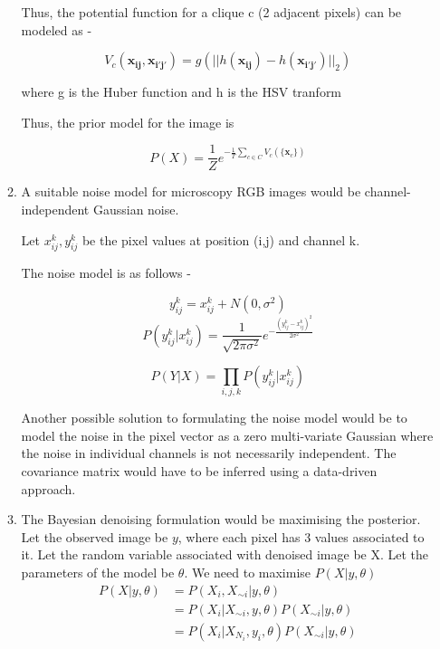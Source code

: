 \documentclass[11pt]{article}
\begin{document}
\begin{enumerate}
\begin{enumerate}
        Thus, the potential function for a clique c (2 adjacent pixels) can be modeled as - 
        
        $$
        V_c(\boldsymbol{x_{ij}},\boldsymbol{x_{i'j'}}) = g(||h(\boldsymbol{x_{ij}}) - h(\boldsymbol{x_{i'j'}})||_2)
        $$
        
        where g is the Huber function and h is the HSV tranform
        
        Thus, the prior model for the image is 
        
        $$
        P(X) = \frac{1}{Z}e^{-\frac{1}{T}\sum_{c \in C} V_c(\{\boldsymbol{x}_c\})}
        $$
        
        \item A suitable noise model for microscopy RGB images would be channel-independent Gaussian noise.
        
        Let $x_{ij}^k,y_{ij}^k$ be the pixel values at position (i,j) and channel k.
        
        The noise model is as follows - 
        
        $$
        y_{ij}^k = x_{ij}^k + N(0,\sigma^2)
        $$
        $$
        P(y_{ij}^k | x_{ij}^k) = \frac{1}{\sqrt{2\pi\sigma^2}}e^{-\frac{(y_{ij}^k - x_{ij}^k)^2}{2\sigma^2}}
        $$
        
        $$
        P(Y|X) = \prod_{i,j,k} P(y_{ij}^k | x_{ij}^k)
        $$
        
        Another possible solution to formulating the noise model would be to model the noise in the pixel vector as a zero multi-variate Gaussian where the noise in individual channels is not necessarily independent. 
        The covariance matrix would have to be inferred using a data-driven approach.
        
        \item The Bayesian denoising formulation would be maximising the posterior. Let the observed image be $y$, where each pixel has 3 values associated to it. Let the random variable associated with denoised image be X. Let the parameters of the model be $\theta$.
        We need to maximise $P(X | y, \theta)$
        \begin{align*}
            P(X | y, \theta) &= P(X_i, X_{\sim i} | y, \theta)\\
            &= P(X_i | X_{\sim i}, y, \theta) P(X_{\sim i} | y, \theta)\\
            &= P(X_i | X_{N_i}, y_i, \theta) P(X_{\sim i} | y, \theta)\\
        \end{align*}


\end{enumerate}
\end{enumerate}
\end{document}
